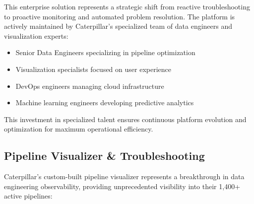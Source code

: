 \documentclass[12pt, a4paper]{article} %
\begin{document}
This enterprise solution represents a strategic shift from reactive troubleshooting to proactive monitoring and automated problem resolution. The platform is actively maintained by Caterpillar's specialized team of data engineers and visualization experts:
\begin{itemize}
    \item Senior Data Engineers specializing in pipeline optimization
    \item Visualization specialists focused on user experience
    \item DevOps engineers managing cloud infrastructure
    \item Machine learning engineers developing predictive analytics
\end{itemize}

This investment in specialized talent ensures continuous platform evolution and optimization for maximum operational efficiency.

\subsection{Pipeline Visualizer \& Troubleshooting}

Caterpillar's custom-built pipeline visualizer represents a breakthrough in data engineering observability, providing unprecedented visibility into their 1,400+ active pipelines:
\end{document}
